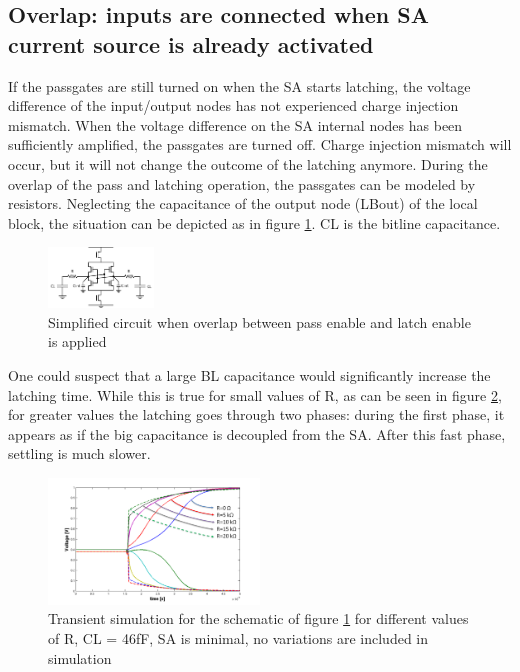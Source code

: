 \documentclass[journal]{IEEEtran}
\begin{document}
\subsection{Overlap: inputs are connected when SA current source is already activated}
If the passgates are still turned on when the SA starts latching, the voltage difference of the input/output nodes has not experienced charge injection mismatch. When the voltage difference on the SA internal nodes has been sufficiently amplified, the passgates are turned off. Charge injection mismatch will occur, but it will not change the outcome of the latching anymore. During the overlap of the pass and latching operation, the passgates can be modeled by resistors. Neglecting the capacitance of the output node (LBout) of the local block, the situation can be depicted as in figure \ref{fig:RC-latch}. CL is the bitline capacitance.

\begin{figure}[ht!]
  \centering
  \includegraphics[width=0.25\textwidth]{../fig/hfdstk-sensamp-RC-latch.png}
  \caption{Simplified circuit when overlap between pass enable and latch enable is applied}
  \label{fig:RC-latch}
\end{figure}

One could suspect that a large BL capacitance would significantly increase the latching time. While this is true for small values of R, as can be seen in figure \ref{fig:RC-latch-sim}, for greater values the latching goes through two phases: during the first phase, it appears as if the big capacitance is decoupled from the SA. After this fast phase, settling is much slower. 

\begin{figure}[ht!]
  \centering
  \includegraphics[width=0.5\textwidth]{../fig/hfdstk-sensamp-RC-latch-sim.png}
  \caption{Transient simulation for the schematic of figure \ref{fig:RC-latch} for different values of R, CL = 46fF, SA is minimal, no variations are included in simulation}
  \label{fig:RC-latch-sim}
\end{figure}
\end{document}
